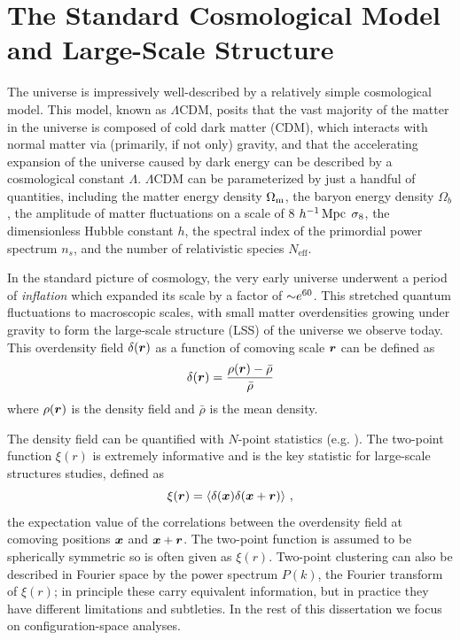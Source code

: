 \graphicspath{{figures/figures_intro/}}


\section{The Standard Cosmological Model and Large-Scale Structure}

The universe is impressively well-described by a relatively simple cosmological model.
This model, known as $\Lambda$CDM, posits that the vast majority of the matter in the universe is composed of cold dark matter (CDM), which interacts with normal matter via (primarily, if not only) gravity, and that the accelerating expansion of the universe caused by dark energy can be described by a cosmological constant $\Lambda$.
$\Lambda$CDM can be parameterized by just a handful of quantities, including the matter energy density $\Omega_\mathrm{m}$, the baryon energy density $\Omega_{b}$, the amplitude of matter fluctuations on a scale of 8 $h^{-1}\,\mathrm{Mpc}$ $\sigma_\mathrm{8}$, the dimensionless Hubble constant $h$, the spectral index of the primordial power spectrum $n_{s}$, and the number of relativistic species $N_{\mathrm{eff}}$. 

In the standard picture of cosmology, the very early universe underwent a period of \emph{inflation} which expanded its scale by a factor of $\mathord{\sim} e^{60}$.
This stretched quantum fluctuations to macroscopic scales, with small matter overdensities growing under gravity to form the large-scale structure (LSS) of the universe we observe today.
This overdensity field $\delta(\bm{r})$ as a function of comoving scale $\bm{r}$ can be defined as
\begin{equation}
    \delta(\bm{r}) = \frac{\rho(\bm{r}) - \bar{\rho}}{\bar{\rho}}
\end{equation}
where $\rho(\bm{r})$ is the density field and $\bar{\rho}$ is the mean density.

The density field can be quantified with $N$-point statistics (e.g. \citealt{peebles_large-scale_1980}).
The two-point function $\xi(r)$ is extremely informative and is the key statistic for large-scale structures studies, defined as
\begin{equation}
    \label{eq:xi}
    \xi(\bm{r}) = \langle \delta(\bm{x}) \delta(\bm{x} + \bm{r}) \rangle ~,
\end{equation}
the expectation value of the correlations between the overdensity field at comoving positions $\bm{x}$ and $\bm{x}+\bm{r}$.
The two-point function is assumed to be spherically symmetric so is often given as $\xi(r)$.
Two-point clustering can also be described in Fourier space by the power spectrum $P(k)$, the Fourier transform of $\xi(r)$; in principle these carry equivalent information, but in practice they have different limitations and subtleties.
In the rest of this dissertation we focus on configuration-space analyses.

